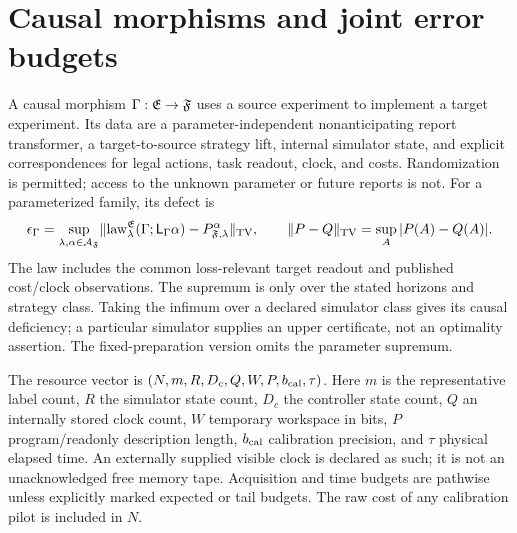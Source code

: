 \section{Causal morphisms and joint error budgets}\label{sec:transfer}
A causal morphism $\Gamma:\mathfrak E\to\mathfrak F$ uses a source experiment to implement a target experiment. Its data are a parameter-independent nonanticipating report transformer, a target-to-source strategy lift, internal simulator state, and explicit correspondences for legal actions, task readout, clock, and costs. Randomization is permitted; access to the unknown parameter or future reports is not. For a parameterized family, its defect is
\begin{equation}\label{eq:defect}
 \epsilon_\Gamma=\sup_{\lambda,\alpha\in\mathcal A_\mathfrak F}
 \lVert\operatorname{law}_\lambda^\mathfrak E(\Gamma;\mathsf L_\Gamma\alpha)
          -P^{\alpha}_{\mathfrak F,\lambda}\rVert_{\mathrm{TV}},
 \qquad \lVert P-Q\rVert_{\mathrm{TV}}=\sup_A|P(A)-Q(A)|.
\end{equation}
The law includes the common loss-relevant target readout and published cost/clock observations. The supremum is only over the stated horizons and strategy class. Taking the infimum over a declared simulator class gives its causal deficiency; a particular simulator supplies an upper certificate, not an optimality assertion. The fixed-preparation version omits the parameter supremum.

The resource vector is $(N,m,R,D_c,Q,W,P,b_{\rm cal},\tau)$. Here $m$ is the representative label count, $R$ the simulator state count, $D_c$ the controller state count, $Q$ an internally stored clock count, $W$ temporary workspace in bits, $P$ program/readonly description length, $b_{\rm cal}$ calibration precision, and $\tau$ physical elapsed time. An externally supplied visible clock is declared as such; it is not an unacknowledged free memory tape. Acquisition and time budgets are pathwise unless explicitly marked expected or tail budgets. The raw cost of any calibration pilot is included in $N$.

